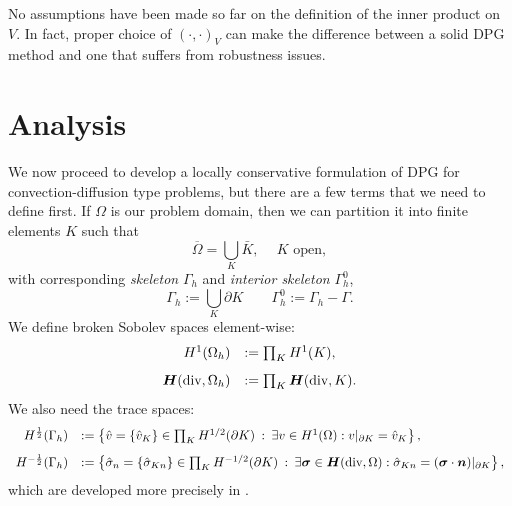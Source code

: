 \documentclass[letterpaper]{article}
\newcommand{\LRp}[1]{\left( #1 \right)}
\newcommand{\ptl}{{\partial}}
\newcommand{\bfsig}{\mbox{\boldmath $\sigma$}}
\newcommand{\bfn}{\mbox{\boldmath $n$}}
\newcommand{\bfH}{\mbox{\boldmath $H$}}
\begin{document}
No assumptions have been made so far on the definition of the inner product on
$V$. In fact, proper choice of $\LRp{\cdot,\cdot}_V$ can make the difference
between a solid DPG method and one that suffers from robustness issues.

\section{Analysis}
We now proceed to develop a locally conservative formulation of DPG for
convection-diffusion type problems, but there are a few terms that we need to
define first. If $\Omega$ is our problem domain, then we can partition it into
finite elements $K$ such that
\[
\overline{\Omega} = \bigcup_K  \bar{K},\: \quad K \text { open},
\]
with corresponding {\em skeleton} $\Gamma_h$ and {\em interior
  skeleton} $\Gamma_h^0$,
\[
\Gamma_h := \bigcup_K \partial K\qquad \Gamma_h^0 := \Gamma_h - \Gamma.
\]
We define broken Sobolev spaces element-wise:
\[
\begin{array}{rl}
H^1(\Omega_h) & := \prod_K H^1(K), \\[8pt]
\bfH(\text{div},\Omega_h) & := \prod_K \bfH(\text{div},K).
\end{array}
\]
We also need the trace spaces:
\[
\begin{array}{rl}
H^\frac{1}{2}(\Gamma_h) & := \left\{ \hat{v} = \{\hat{v}_K \} \in \prod_K H^{1/2}(\ptl K) \: :
\: \exists v \in H^1(\Omega) : v\vert_{\ptl K} = \hat{v}_K \right\}, \\[8pt]
H^{-\frac{1}{2}}(\Gamma_h) & := \left\{ {\hat{\sigma}}_n = \{ {\hat{\sigma}}_{Kn} \}\in \prod_K H^{-1/2}(\ptl K) \: : \: \exists \bfsig \in \bfH(\text{div},\Omega)
: {\hat{\sigma}}_{Kn} = (\bfsig \cdot \bfn)\vert_{\ptl K} \right\},
\end{array}
\]
which are developed more precisely in \cite{DPGStokes}.
\end{document}

